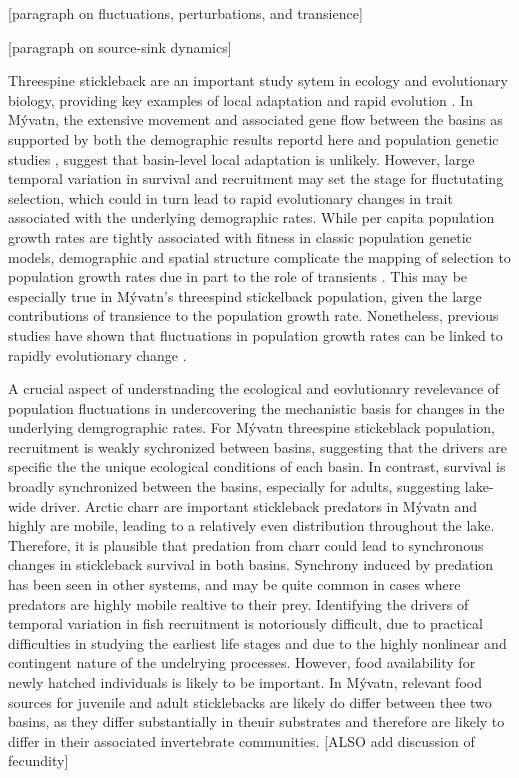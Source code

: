 \documentclass[11pt]{article}
\begin{document}
[paragraph on fluctuations, perturbations, and transience]

[paragraph on source-sink dynamics]

Threespine stickleback are an important study sytem in ecology and evolutionary biology,
providing key examples of local adaptation 
\citep{}
and rapid evolution
\citep{}.
In M\'{y}vatn, the extensive movement and associated gene flow between the basins 
as supported by both the demographic results reportd here 
and population genetic studies \citep{millet2013},
suggest that basin-level local adaptation is unlikely.
However, large temporal variation in survival and recruitment may set the 
stage for fluctutating selection, 
which could in turn lead to rapid evolutionary changes in trait associated 
with the underlying demographic rates.
While per capita population growth rates are tightly associated with fitness 
in classic population genetic models,
demographic and spatial structure complicate the mapping
of selection to population growth rates due in part to the role of transients
\citep{}.
This may be especially true in M\'{y}vatn's threespind stickelback population,
given the large contributions of transience to the population growth rate.
Nonetheless, previous studies have shown that fluctuations in population growth rates
can be linked to rapidly evolutionary change
\citep{}.

A crucial aspect of understnading the ecological and eovlutionary revelevance of 
population fluctuations in undercovering the mechanistic basis for changes in the underlying
demgrographic rates.
For M\'{y}vatn threespine stickeblack population,
recruitment is weakly sychronized between basins,
suggesting that the drivers are specific the the unique ecological conditions of each basin.
In contrast, survival is broadly synchronized between the basins, especially for adults,
suggesting lake-wide driver.
Arctic charr are important stickleback predators in M\'{y}vatn and highly are mobile,
leading to a relatively even distribution throughout the lake. 
Therefore, it is plausible that predation from charr could lead to synchronous 
changes in stickleback survival in both basins.
Synchrony induced by predation has been seen in other systems,
and may be quite common in cases where predators are highly mobile realtive to their prey.
Identifying the drivers of temporal variation in fish recruitment is notoriously difficult,
due to practical difficulties in studying the earliest life stages and due to
the highly nonlinear and contingent nature of the undelrying processes.
However, food availability for newly hatched individuals is likely to be important.
In M\'{y}vatn, relevant food sources for juvenile and adult sticklebacks are likely
do differ between thee two basins,
as they differ substantially in theuir substrates and therefore are likely 
to differ in their associated invertebrate communities.
[ALSO add discussion of fecundity]
\end{document}

